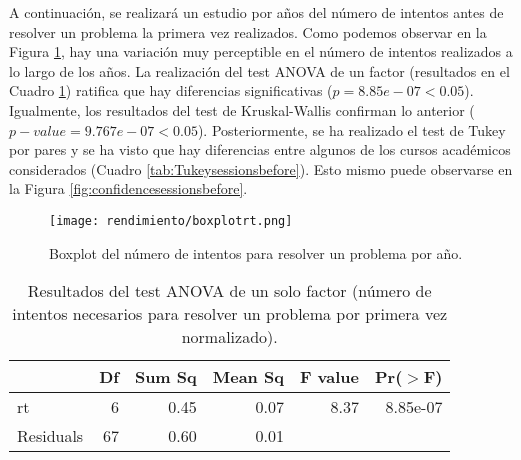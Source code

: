 A continuación, se realizará un estudio por años del número de intentos antes de resolver un problema la primera vez realizados. Como podemos observar en la Figura \ref{fig:boxplotsessionsbefore}, hay una variación muy perceptible en el número de intentos realizados a lo largo de los años. La realización del test ANOVA de un factor (resultados en el Cuadro \ref{tab:ANOVAsessionsbefore}) ratifica que hay diferencias significativas ($p = 8.85e-07 < 0.05$). Igualmente, los resultados del test de Kruskal-Wallis confirman lo anterior ($p-value = 9.767e-07 < 0.05$). Posteriormente, se ha realizado el test de Tukey por pares y se ha visto que hay diferencias entre algunos de los cursos académicos considerados (Cuadro \ref{tab:Tukeysessionsbefore}). Esto mismo puede observarse en la Figura \ref{fig:confidencesessionsbefore}.

\begin{figure}[H]
    \centering
    \texttt{[image: rendimiento/boxplotrt.png]}
    \caption{Boxplot del número de intentos para resolver un problema por año.}
    \label{fig:boxplotsessionsbefore}
\end{figure}

\begin{table}[H]
\centering
\caption{Resultados del test ANOVA de un solo factor (número de intentos necesarios para resolver un problema por primera vez normalizado).}
\label{tab:ANOVAsessionsbefore}
\begin{tabular}{lrrrrr}
  \hline
 & Df & Sum Sq & Mean Sq & F value & Pr($>$F) \\ 
  \hline
rt & 6 & 0.45 & 0.07 & 8.37 & 8.85e-07 \\ 
  Residuals        & 67 & 0.60 & 0.01 &  &  \\ 
   \hline
\end{tabular}
\end{table}

